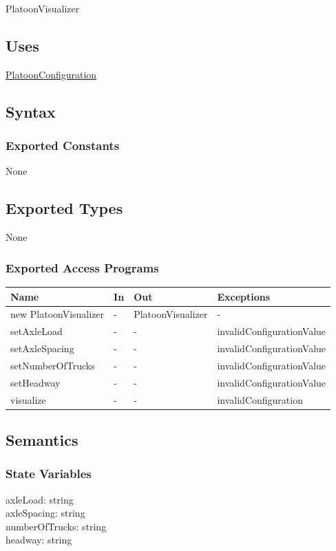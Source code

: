 \documentclass[12pt, titlepage]{article}
\begin{document}
PlatoonVisualizer

\subsection{Uses}
\hyperref[PlatoonConfiguration]{PlatoonConfiguration}

\subsection{Syntax}

\subsubsection{Exported Constants}
None
\subsection{Exported Types}
None

\subsubsection{Exported Access Programs}
\begin{center}
\begin{tabular}{p{5cm} p{2cm} p{4cm} p{5.5cm}}
\hline
\textbf{Name} & \textbf{In} & \textbf{Out} & \textbf{Exceptions} \\
\hline
new PlatoonVisualizer & - & PlatoonVisualizer & - \\
\hline
setAxleLoad & - & - & invalidConfigurationValue \\
\hline
setAxleSpacing & - & - & invalidConfigurationValue\\
\hline
setNumberOfTrucks & - & - & invalidConfigurationValue \\
\hline
setHeadway & - & - & invalidConfigurationValue \\
\hline
visualize & - & - & invalidConfiguration \\
\hline
\end{tabular}
\end{center}

\subsection{Semantics}

\subsubsection{State Variables}
axleLoad: string\\
axleSpacing: string\\
numberOfTrucks: string\\
headway: string
\end{document}
